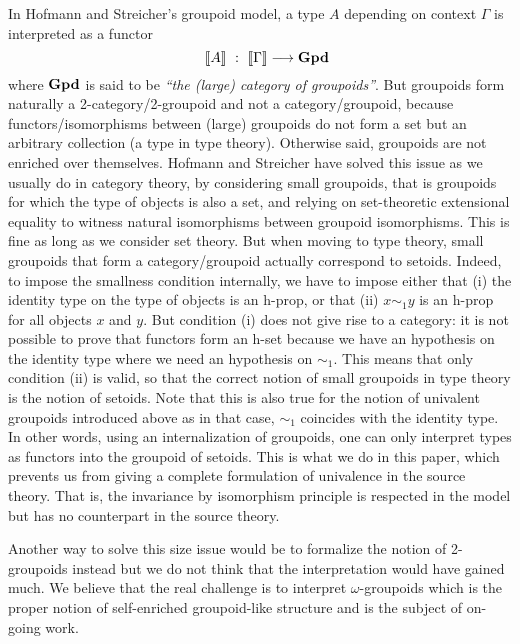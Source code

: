 In Hofmann and Streicher's groupoid model, a type $A$ depending on
context $\Gamma$ is interpreted as a functor 
\hspace{-1em}
$$
\sem{A} \ : \ \sem{\Gamma} \longrightarrow \GPD
\hspace{-1em}
$$
%
where $\mathbf{Gpd}$ is said to be \emph{``the (large) category of groupoids''}. 
%
But groupoids form naturally a 2-category/2-groupoid and not a
category/groupoid, because functors/isomorphisms between (large)
groupoids do not form a set but an arbitrary collection (a type in type
theory). Otherwise said, groupoids are not enriched over themselves.
%
Hofmann and Streicher have solved this issue as we usually do in
category theory, by considering small groupoids, that is groupoids for
which the type of objects is also a set, and relying on set-theoretic
extensional equality to witness natural isomorphisms between groupoid 
isomorphisms. This is fine as long as we consider set theory.
%
But when moving to type theory, small groupoids that form a
category/groupoid actually correspond to setoids. Indeed, to impose the
smallness condition internally, we have to impose either that (i)
the identity type on the type of objects is an h-prop, or that (ii) $x
\sim_1 y$ is an h-prop for all objects $x$ and $y$. But
condition (i) does not give rise to a category: it is not possible to prove that
functors form an h-set because we have an hypothesis on the identity type
where we need an hypothesis on $\sim_1$. 
%
This means that only condition (ii) is valid, so that the
correct notion of small groupoids in type theory is the notion of
setoids.
%
Note that this is also true for the notion of univalent groupoids
introduced above as in that case, $\sim_1$ coincides with the identity type.
%
In other words, using an internalization of groupoids, one can only
interpret types as functors into the groupoid of setoids. This is what we do
in this paper, which prevents us from giving a complete formulation of
univalence in the source theory. That is, the invariance by
isomorphism principle is respected in the model but has no counterpart
in the source theory. 

Another way to solve this size issue would be to formalize the notion of
2-groupoids instead but we do not think that the interpretation would
have gained much. We believe that the real challenge is to interpret
$\omega$-groupoids which is the proper notion of self-enriched 
groupoid-like structure and is the subject of on-going work.


